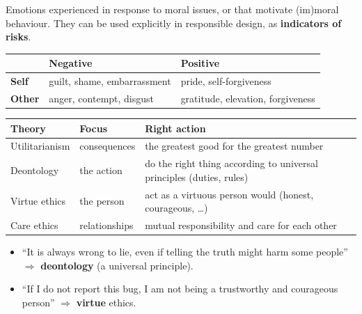 \documentclass[11pt,a4paper,openany]{book}
\begin{document}
\begin{defnbox}[title={Moral emotions (Roeser, 2012; Tangney et al., 2007)}]
Emotions experienced in response to moral issues, or that motivate (im)moral behaviour. They
can be used explicitly in responsible design, as \textbf{indicators of risks}.
\begin{center}
\begin{tabular}{l|l|l}
 & \textbf{Negative} & \textbf{Positive} \\ \hline
\textbf{Self}  & guilt, shame, embarrassment & pride, self-forgiveness \\
\textbf{Other} & anger, contempt, disgust    & gratitude, elevation, forgiveness
\end{tabular}
\end{center}
\end{defnbox}

\begin{defnbox}[title={Normative ethical theories}]
\begin{center}
\begin{tabularx}{\linewidth}{l l X}
\textbf{Theory} & \textbf{Focus} & \textbf{Right action} \\ \hline
Utilitarianism & consequences  & the greatest good for the greatest number \\
Deontology     & the action    & do the right thing according to universal principles (duties, rules) \\
Virtue ethics  & the person    & act as a virtuous person would (honest, courageous, \ldots) \\
Care ethics    & relationships & mutual responsibility and care for each other
\end{tabularx}
\end{center}
\end{defnbox}

\begin{exbox}[title={Exam-type questions}]
\begin{itemize}
  \item ``It is always wrong to lie, even if telling the truth might harm some people'' $\Rightarrow$
        \textbf{deontology} (a universal principle).
  \item ``If I do not report this bug, I am not being a trustworthy and courageous person''
        $\Rightarrow$ \textbf{virtue} ethics.
\end{itemize}
\end{exbox}
\end{document}
